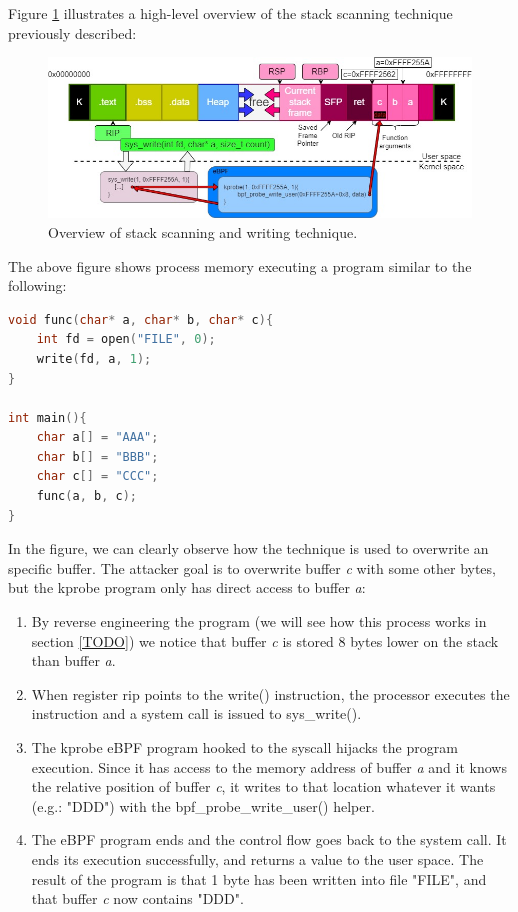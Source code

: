 \documentclass[12pt]{report} %
\begin{document}
Figure \ref{fig:stack_scan_write_tech} illustrates a high-level overview of the stack scanning technique previously described:
\begin{figure}[H]
	\centering
	\includegraphics[width=16cm]{stack_scan_write_tech.jpg}
	\caption{Overview of stack scanning and writing technique.}
	\label{fig:stack_scan_write_tech}
\end{figure}

The above figure shows process memory executing a program similar to the following:
\begin{lstlisting}[language=C, caption={Sample program being executed on figure \ref{fig:stack_scan_write_tech}.}, label={code:stack_scan_write_tech}]
void func(char* a, char* b, char* c){
	int fd = open("FILE", 0);
	write(fd, a, 1);
}

int main(){
	char a[] = "AAA";
	char b[] = "BBB";
	char c[] = "CCC";
	func(a, b, c);
}
\end{lstlisting}

In the figure, we can clearly observe how the technique is used to overwrite an specific buffer. The attacker goal is to overwrite buffer \textit{c} with some other bytes, but the kprobe program only has direct access to buffer \textit{a}:
\begin{enumerate}
\item By reverse engineering the program (we will see how this process works in section \ref{TODO}) we notice that buffer \textit{c} is stored 8 bytes lower on the stack than buffer \textit{a}.
\item When register rip points to the write() instruction, the processor executes the instruction and a system call is issued to sys\_write().
\item The kprobe eBPF program hooked to the syscall hijacks the program execution. Since it has access to the memory address of buffer \textit{a} and it knows the relative position of buffer \textit{c}, it writes to that location whatever it wants (e.g.: "DDD") with the bpf\_probe\_write\_user() helper.
\item The eBPF program ends and the control flow goes back to the system call. It ends its execution successfully, and returns a value to the user space. The result of the program is that 1 byte has been written into file "FILE", and that buffer \textit{c} now contains "DDD".
\end{enumerate}
\end{document}
